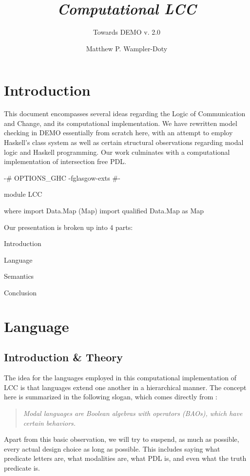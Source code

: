 \documentclass[11pt]{article}
\title{\emph{Computational LCC}}
\subtitle{ Towards \textup{\textsf{DEMO}} v. 2.0}
\author{Matthew P. Wampler-Doty}
\date{}
\theoremstyle{definition}
\begin{document}
\maketitle

\section{Introduction}

This document encompasses several ideas regarding the Logic of Communication and Change, and its computational implementation.  We have rewritten model checking in \textsf{DEMO} essentially from scratch here, with an attempt to employ Haskell's class system as well as certain structural observations regarding modal logic and Haskell programming.  Our work culminates with a computational implementation of intersection free PDL.

\begin{code}
{-# OPTIONS_GHC -fglasgow-exts #-}

module LCC

where
import Data.Map (Map)
import qualified Data.Map as Map
\end{code}

Our presentation is broken up into 4 parts:
\begin{mynum}
\item Introduction
\item Language
\item Semantics
\item Conclusion
\end{mynum}

\section{Language}
\subsection{Introduction \& Theory}
The idea for the languages employed in this computational implementation of LCC is that languages extend one another in a hierarchical manner.  The concept here is summarized in the following slogan, which comes directly from \cite{blackburn}:
\begin{quote}
\emph{Modal languages are Boolean algebras with operators (BAOs), which have certain behaviors.}
\end{quote}

Apart from this basic observation, we will try to suspend, as much as possible, every actual design choice as long as possible.  This includes saying what predicate letters are, what modalities are, what PDL is, and even what the truth predicate is.
\end{document}
